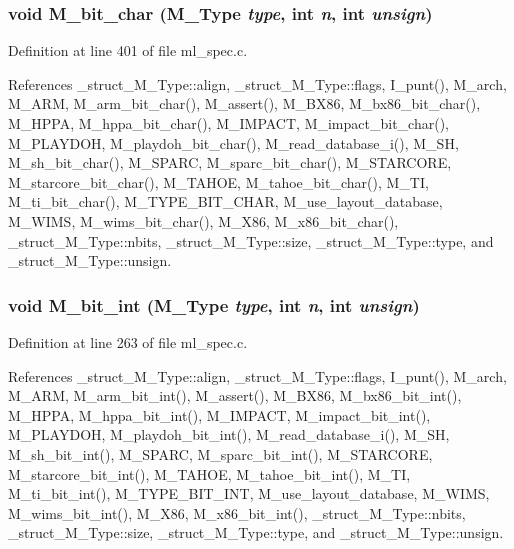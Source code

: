 \subsubsection{\setlength{\rightskip}{0pt plus 5cm}void M\_\-bit\_\-char (\bf{M\_\-Type} {\em type}, int {\em n}, int {\em unsign})}\label{m__spec_8h_4986ab3571eb8d113aeb2afcd5786aa1}




Definition at line 401 of file ml\_\-spec.c.

References \_\-struct\_\-M\_\-Type::align, \_\-struct\_\-M\_\-Type::flags, I\_\-punt(), M\_\-arch, M\_\-ARM, M\_\-arm\_\-bit\_\-char(), M\_\-assert(), M\_\-BX86, M\_\-bx86\_\-bit\_\-char(), M\_\-HPPA, M\_\-hppa\_\-bit\_\-char(), M\_\-IMPACT, M\_\-impact\_\-bit\_\-char(), M\_\-PLAYDOH, M\_\-playdoh\_\-bit\_\-char(), M\_\-read\_\-database\_\-i(), M\_\-SH, M\_\-sh\_\-bit\_\-char(), M\_\-SPARC, M\_\-sparc\_\-bit\_\-char(), M\_\-STARCORE, M\_\-starcore\_\-bit\_\-char(), M\_\-TAHOE, M\_\-tahoe\_\-bit\_\-char(), M\_\-TI, M\_\-ti\_\-bit\_\-char(), M\_\-TYPE\_\-BIT\_\-CHAR, M\_\-use\_\-layout\_\-database, M\_\-WIMS, M\_\-wims\_\-bit\_\-char(), M\_\-X86, M\_\-x86\_\-bit\_\-char(), \_\-struct\_\-M\_\-Type::nbits, \_\-struct\_\-M\_\-Type::size, \_\-struct\_\-M\_\-Type::type, and \_\-struct\_\-M\_\-Type::unsign.
\subsubsection{\setlength{\rightskip}{0pt plus 5cm}void M\_\-bit\_\-int (\bf{M\_\-Type} {\em type}, int {\em n}, int {\em unsign})}\label{m__spec_8h_b8fa5fce803586c5b36fa8d2a0830037}




Definition at line 263 of file ml\_\-spec.c.

References \_\-struct\_\-M\_\-Type::align, \_\-struct\_\-M\_\-Type::flags, I\_\-punt(), M\_\-arch, M\_\-ARM, M\_\-arm\_\-bit\_\-int(), M\_\-assert(), M\_\-BX86, M\_\-bx86\_\-bit\_\-int(), M\_\-HPPA, M\_\-hppa\_\-bit\_\-int(), M\_\-IMPACT, M\_\-impact\_\-bit\_\-int(), M\_\-PLAYDOH, M\_\-playdoh\_\-bit\_\-int(), M\_\-read\_\-database\_\-i(), M\_\-SH, M\_\-sh\_\-bit\_\-int(), M\_\-SPARC, M\_\-sparc\_\-bit\_\-int(), M\_\-STARCORE, M\_\-starcore\_\-bit\_\-int(), M\_\-TAHOE, M\_\-tahoe\_\-bit\_\-int(), M\_\-TI, M\_\-ti\_\-bit\_\-int(), M\_\-TYPE\_\-BIT\_\-INT, M\_\-use\_\-layout\_\-database, M\_\-WIMS, M\_\-wims\_\-bit\_\-int(), M\_\-X86, M\_\-x86\_\-bit\_\-int(), \_\-struct\_\-M\_\-Type::nbits, \_\-struct\_\-M\_\-Type::size, \_\-struct\_\-M\_\-Type::type, and \_\-struct\_\-M\_\-Type::unsign.
